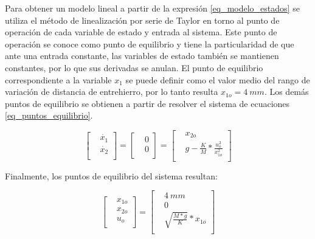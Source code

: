 Para obtener un modelo lineal a partir de la expresión \ref{eq_modelo_estados} se utiliza el método de linealización por serie de Taylor en torno al punto de operación de cada variable de estado y entrada al sistema. Este punto de operación se conoce como punto de equilibrio y tiene la particularidad de que ante una entrada constante, las variables de estado también se mantienen constantes, por lo que sus derivadas se anulan. El punto de equilibrio correspondiente a la variable $x_1$ se puede definir como el valor medio del rango de variación de distancia de entrehierro, por lo tanto resulta $x_{1o}=4\:mm$. Los demás puntos de equilibrio se obtienen a partir de resolver el sistema de ecuaciones \ref{eq_puntos_equilibrio}.

\begin{equation} \label{eq_puntos_equilibrio}
	\begin{bmatrix} %
		&\dot{x_{1}}\\
		&\dot{x_{2}}\\
	\end{bmatrix}
	=
	\begin{bmatrix} %
		&0\\
		&0\\
	\end{bmatrix}
	=
	\begin{bmatrix} %
		&x_{2o}\\
		&g-\frac{K}{M}*\frac{u_o^{2}}{x_{1o}^{2}}\\
	\end{bmatrix}
\end{equation}

Finalmente, los puntos de equilibrio del sistema resultan:

\begin{equation}\label{eq_puntos_equil}
	\begin{bmatrix}
		&x_{1o}\\
		&x_{2o}\\
		&u_{o}\\
	\end{bmatrix}
	=
	\begin{bmatrix}
		&4\:mm\\
		&0\\
		&\sqrt{\frac{M*g}{K}}*x_{1o}\\
	\end{bmatrix}
\end{equation}



